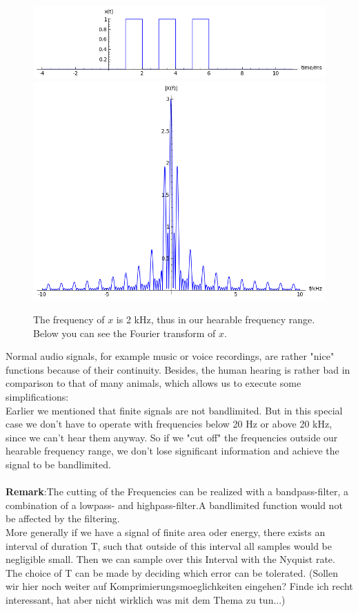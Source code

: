 \documentclass[a4paper, 11pt]{scrreprt}
\begin{document}
\begin{figure}[htpb]
\centering
\includegraphics[height=0.20\textwidth]{x(t).png}
\includegraphics[height=0.80\textwidth]{X(f).png}
\caption{The frequency of $x$ is 2 kHz, thus in our hearable frequency range. Below you can see the Fourier transform of \(x\).}

\end{figure}


Normal audio signals, for example music or voice recordings, are rather "nice" functions because of their continuity. Besides, the human hearing is rather bad in comparison to that of many animals, which allows us to execute some simplifications:\\
Earlier we mentioned that finite signals are not bandlimited. But in this special case we don't have to operate with frequencies below 20 Hz or above 20 kHz, since we can't hear them anyway. So if we "cut off" the frequencies outside our hearable frequency range, we don't lose significant information and achieve the signal to be bandlimited. \\\\
\textbf{Remark}:The cutting of the Frequencies can be realized with a bandpass-filter, a combination of a lowpass- and highpass-filter.A bandlimited function would not be affected by the filtering.\\
More generally if we have a signal of finite area oder energy, there exists an interval of duration T, such that outside of this interval all samples would be negligible small. Then we can sample over this Interval with the Nyquist rate. The choice of T can be made by deciding which error can be tolerated.
(Sollen wir hier noch weiter auf Komprimierungsmoeglichkeiten eingehen? Finde ich recht interessant, hat aber nicht wirklich was mit dem Thema zu tun...)\\
\end{document}
